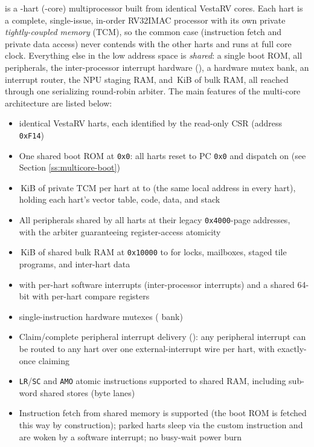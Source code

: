 \AsicNameForUserGuide{} is a \NumHartsWord-hart (\NumHartsWord-core) multiprocessor built from \NumHartsWord{} identical VestaRV cores. Each hart is a complete, single-issue, in-order RV32IMAC processor with its own private \textit{tightly-coupled memory} (TCM), so the common case (instruction fetch and private data access) never contends with the other harts and runs at full core clock. Everything else in the low address space is \textit{shared}: a single boot ROM, all peripherals, the inter-processor interrupt hardware (), a hardware mutex bank, an interrupt router, \ifnpupresent the NPU staging RAM, \fi and \SharedRamSizeKiB\,KiB of bulk RAM, all reached through one serializing round-robin arbiter. The main features of the multi-core architecture are listed below:

\begin{itemize}
	\item \NumHarts{} identical VestaRV harts, each identified by the read-only  CSR (address \texttt{0xF14})
	\item One shared boot ROM at \texttt{0x0}: all \NumHartsWord{} harts reset to PC \texttt{0x0} and dispatch on  (see Section \ref{ss:multicore-boot})
	\item \TcmSizeKiB\,KiB of private TCM per hart at \texttt{\RamStartAddress} to \texttt{\RamEndAddress} (the same local address in every hart), holding each hart's vector table, code, data, and stack
	\item All peripherals shared by all \NumHartsWord{} harts at their legacy \texttt{0x4000}-page addresses, with the arbiter guaranteeing register-access atomicity
	\item \SharedRamSizeKiB\,KiB of shared bulk RAM at \texttt{0x10000} to \texttt{\SharedRamEndAddress} for locks, mailboxes, staged tile programs, and inter-hart data
	\item {} with per-hart software interrupts (inter-processor interrupts) and a shared 64-bit  with per-hart compare registers
	\item \NumMutexes{} single-instruction hardware mutexes ( bank)
	\item Claim/complete peripheral interrupt delivery (): any peripheral interrupt can be routed to any hart over one external-interrupt wire per hart, with exactly-once claiming
	\item \texttt{LR}/\texttt{SC} and \texttt{AMO} atomic instructions supported to shared RAM, including sub-word shared stores (byte lanes)
	\item Instruction fetch from shared memory is supported (the boot ROM is fetched this way by construction); parked harts sleep via the custom  instruction and are woken by a software interrupt; no busy-wait power burn
\end{itemize}



